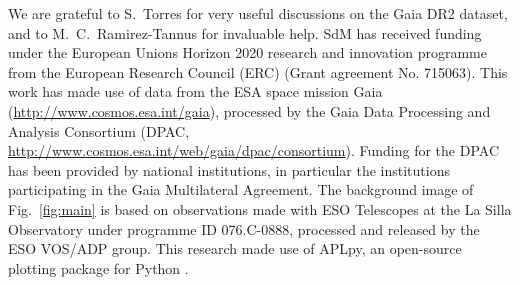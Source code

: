 \documentclass[apjl,twocolumn]{emulateapj}
\newcommand{\todo}[1]{{\large $\blacksquare$~\textbf{\color{red}[#1]}}~$\blacksquare$}
\DeclareRobustCommand{\Figref}[1]{Fig.~\ref{#1}}
\begin{document}




\begin{acknowledgements}
  \small
  We are grateful to S.~Torres for 
  very useful discussions on the
  Gaia DR2 dataset, and to M.~C.~Ramirez-Tannus for invaluable help.
  SdM has received funding under the European Unions Horizon 2020 research and innovation programme from the European Research
  Council (ERC) (Grant agreement No. 715063).
  This work has made use of data from the ESA space mission Gaia (\url{http://www.cosmos.esa.int/gaia}), processed by the Gaia Data Processing and Analysis Consortium (DPAC, \url{http://www.cosmos.esa.int/web/gaia/dpac/consortium}). Funding for the DPAC has been provided by national institutions, in particular the institutions participating in the Gaia Multilateral Agreement. 
  The background image of \Figref{fig:main} is based on observations
  made with ESO Telescopes at the La Silla Observatory under programme
  ID 076.C-0888, processed and released by the ESO VOS/ADP group.
  This research made use of APLpy, an open-source plotting package for Python \citep[][]{robitaille:12}.
\end{acknowledgements}
\end{document}
